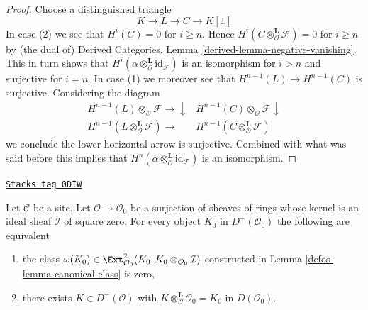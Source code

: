 \begin{proof}
Choose a distinguished triangle
$$
K \to L \to C \to K[1]
$$
In case (2) we see that $H^i(C) = 0$ for $i \geq n$.
Hence $H^i(C \otimes_\mathcal{O}^\mathbf{L} \mathcal{F}) = 0$
for $i \geq n$ by (the dual of)
Derived Categories, Lemma \ref{derived-lemma-negative-vanishing}.
This in turn shows that
$H^i(\alpha \otimes_\mathcal{O}^\mathbf{L} \text{id}_\mathcal{F})$
is an isomorphism for $i > n$ and surjective for $i = n$.
In case (1) we moreover see that $H^{n - 1}(L) \to H^{n - 1}(C)$
is surjective. Considering the diagram
$$
\begin{array}{cc}H^{n - 1}(L) \otimes_\mathcal{O} \mathcal{F} \longrightarrow\downarrow & H^{n - 1}(C) \otimes_\mathcal{O} \mathcal{F} \downarrow \\ H^{n - 1}(L \otimes_\mathcal{O}^\mathbf{L} \mathcal{F}) \longrightarrow & H^{n - 1}(C \otimes_\mathcal{O}^\mathbf{L} \mathcal{F})\end{array}
$$
we conclude the lower horizontal arrow is surjective. Combined with what
was said before this implies that
$H^n(\alpha \otimes_\mathcal{O}^\mathbf{L} \text{id}_\mathcal{F})$
is an isomorphism.
\end{proof}

\begin{lemma}
\label{defos-lemma-canonical-class-obstruction}
\href{https://stacks.math.columbia.edu/tag/0DIW}{\texttt{Stacks tag 0DIW}}

Let $\mathcal{C}$ be a site. Let $\mathcal{O} \to \mathcal{O}_0$
be a surjection of sheaves of rings whose kernel is an ideal sheaf
$\mathcal{I}$ of square zero. For every object
$K_0$ in $D^-(\mathcal{O}_0)$ the following are equivalent
\begin{enumerate}
\item  the class
$\omega(K_0) \in
\Ext^2_{\mathcal{O}_0}(K_0, K_0 \otimes_{\mathcal{O}_0} \mathcal{I})$
constructed in Lemma \ref{defos-lemma-canonical-class} is zero,
\item there exists $K \in D^-(\mathcal{O})$ with
$K \otimes_\mathcal{O}^\mathbf{L} \mathcal{O}_0 = K_0$
in $D(\mathcal{O}_0)$.
\end{enumerate}
\end{lemma}

